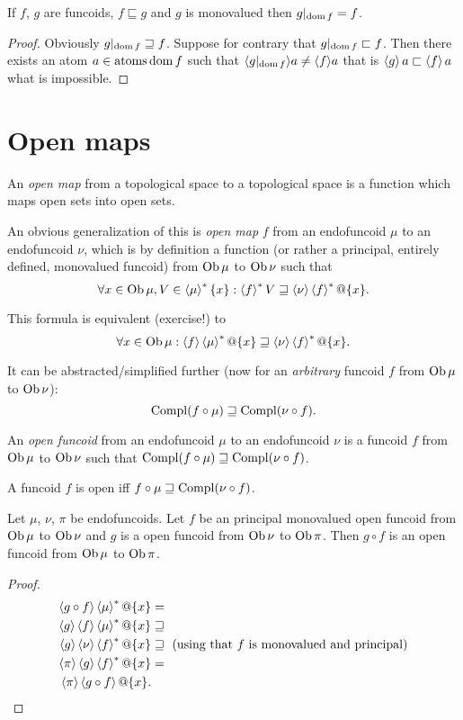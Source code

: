 \begin{thm}
If $f$, $g$ are funcoids, $f\sqsubseteq g$ and $g$ is monovalued
then $g|_{\operatorname{dom} f}=f$.\end{thm}
\begin{proof}
Obviously $g|_{\operatorname{dom} f}\sqsupseteq f$. Suppose for contrary that $g|_{\operatorname{dom}
f}\sqsubset f$.
Then there exists an atom $a\in\operatorname{atoms}\operatorname{dom} f$ such that $\langle g|_{\operatorname{dom}
f}\rangle a\neq\langle f\rangle a$
that is $\left\langle g\right\rangle a\sqsubset\left\langle f\right\rangle a$ what is impossible.
\end{proof}

\section{Open maps}
\begin{defn}
An \emph{open map} from a topological space to a
topological space is a function which maps open sets into open sets.
\end{defn}
An obvious generalization of this is \emph{open map} $f$ from an
endofuncoid $\mu$ to an endofuncoid $\nu$, which is by definition
a function (or rather a principal, entirely defined, monovalued funcoid)
from $\operatorname{Ob}\mu$ to $\operatorname{Ob}\nu$ such that
\[
\forall x\in\operatorname{Ob}\mu,V\in\left\langle \mu\right\rangle ^{\ast}\{x\}:\left\langle f\right\rangle ^{\ast}V\sqsupseteq\left\langle \nu\right\rangle\left\langle f\right\rangle ^{\ast}@\{x\}.
\]


This formula is equivalent (exercise!) to
\[
\forall x\in\operatorname{Ob}\mu:\left\langle f\right\rangle\left\langle \mu\right\rangle ^{\ast}@\{x\}\sqsupseteq\left\langle \nu\right\rangle\left\langle f\right\rangle ^{\ast}@\{x\}.
\]


It can be abstracted/simplified further (now for an \emph{arbitrary}
funcoid $f$ from $\operatorname{Ob}\mu$ to $\operatorname{Ob}\nu$):
\[
\operatorname{Compl}(f\circ\mu)\sqsupseteq\operatorname{Compl}(\nu\circ f).
\]

\begin{defn}
An \emph{open funcoid} from an endofuncoid $\mu$
to an endofuncoid $\nu$ is a funcoid $f$ from $\operatorname{Ob}\mu$ to $\operatorname{Ob}\nu$
such that $\operatorname{Compl}(f\circ\mu)\sqsupseteq\operatorname{Compl}(\nu\circ f)$.\end{defn}
\begin{obvious}
A funcoid $f$ is open iff $f\circ\mu\sqsupseteq\operatorname{Compl}(\nu\circ f)$.\end{obvious}
\begin{thm}
Let $\mu$, $\nu$, $\pi$ be endofuncoids. Let $f$ be an
principal monovalued open funcoid from $\operatorname{Ob}\mu$ to $\operatorname{Ob}\nu$ and $g$ is a open funcoid
from $\operatorname{Ob}\nu$ to $\operatorname{Ob}\pi$. Then $g\circ f$ is an open funcoid from
$\operatorname{Ob}\mu$ to $\operatorname{Ob}\pi$.\end{thm}
\begin{proof}
\begin{align*}
\supfun{g\circ f}\rsupfun{\mu}@\{x\} & = \\
\supfun{g}\supfun{f}\rsupfun{\mu}@\{x\} & \sqsupseteq \\
\supfun{g}\supfun{\nu}\rsupfun{f}@\{x\} & \sqsupseteq \text{ (using that $f$ is monovalued and principal)}\\
\supfun{\pi}\supfun{g}\rsupfun{f}@\{x\} & = \\
\supfun{\pi}\supfun{g\circ f}@\{x\}.
\end{align*}
\end{proof}

